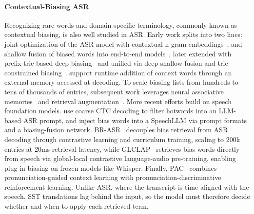 \paragraph{Contextual-Biasing ASR} Recognizing rare words and domain-specific terminology, commonly known as contextual biasing, is also well studied in ASR. Early work splits into two lines: joint optimization of the ASR model with contextual n-gram embeddings~\citep{CLAS,jain20_interspeech}, and shallow fusion of biased words into end-to-end models~\citep{shallow_fusion}, later extended with prefix-trie-based deep biasing~\citep{le21_interspeech} and unified via deep shallow fusion and trie-constrained biasing~\citep{9383560}. \citet{9687898} support runtime addition of context words through an external memory accessed at decoding. To scale biasing lists from hundreds to tens of thousands of entries, subsequent work leverages neural associative memories~\citep{9747726,10023323,wu23e_interspeech,wu-etal-2024-deferred} and retrieval augmentation~\citep{9413756,10095857,jayanthi-etal-2023-retrieve}. 
More recent efforts build on speech foundation models. \citet{10832154} use coarse CTC decoding to filter hotwords into an LLM-based ASR prompt, and \citet{gong24b_interspeech} inject bias words into a SpeechLLM via prompt formats and a biasing-fusion network. BR-ASR~\citep{gong25_interspeech} decouples bias retrieval from ASR decoding through contrastive learning and curriculum training, scaling to 200k entries at 20ms retrieval latency, while GLCLAP~\citep{kong25_interspeech} retrieves bias words directly from speech via global-local contrastive language-audio pre-training, enabling plug-in biasing on frozen models like Whisper. Finally, PAC~\citep{11462669} combines pronunciation-guided context learning with pronunciation-discriminative reinforcement learning. 
Unlike ASR, where the transcript is time-aligned with the speech, SST translations lag behind the input, so the model must therefore decide whether and when to apply each retrieved term.